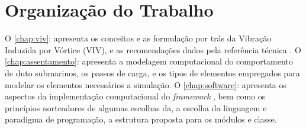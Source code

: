 \section{Organização do Trabalho}

O \autoref{chap:viv}: apresenta os conceitos e as formulação por trás da Vibração Induzida por Vórtice (VIV), e as recomendações dados pela referência técnica . O \autoref{chap:assentamento}: apresenta a modelagem computacional do comportamento de duto submarinos, os passos de carga, e os tipos de elementos empregados para modelar os elementos necessários a simulação. O \autoref{chap:software}: apresenta os aspectos da implementação computacional do \textit{framework} , bem como os princípios norteadores de algumas escolhas da, a escolha da linguagem e paradigma de programação, a estrutura proposta para os módulos e classe.
